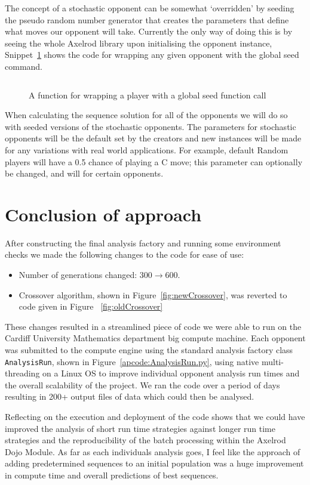 The concept of a stochastic opponent can be somewhat `overridden' by seeding the pseudo random number generator that creates the parameters that define what moves our opponent will take.
Currently the only way of doing this is by seeing the whole Axelrod library upon initialising the opponent instance, Snippet~\ref{code:wrappingFunction} shows the code for wrapping any given opponent with the global seed command.

\begin{figure}
    \inputminted{python}{code_snippets/classWrappingFunction.py}
    \caption{A function for wrapping a player with a global seed function call}\label{code:wrappingFunction}
\end{figure}

When calculating the sequence solution for all of the opponents we will do so with seeded versions of the stochastic opponents.
The parameters for stochastic opponents will be the default set by the creators and new instances will be made for any variations with real world applications.
For example, default Random players will have a 0.5 chance of playing a C move;
this parameter can optionally be changed, and will for certain opponents.

\section{Conclusion of approach}\label{sec:conclusionOfApproach}
After constructing the final analysis factory and running some environment checks we made the following changes to the code for ease of use:
\begin{itemize}
    \item Number of generations changed: $300\rightarrow600$.
    \item Crossover algorithm, shown in Figure~\ref{fig:newCrossover}, was reverted to code given in Figure ~\ref{fig:oldCrossover}
\end{itemize}

These changes resulted in a streamlined piece of code we were able to run on the Cardiff University Mathematics department big compute machine.
Each opponent was submitted to the compute engine using the standard analysis factory class \texttt{AnalysisRun}, shown in Figure~\ref{apcode:AnalysisRun.py}, using native multi-threading on a Linux OS to improve individual opponent analysis run times and the overall scalability of the project.
We ran the code over a period of days resulting in 200+ output files of data which could then be analysed.

Reflecting on the execution and deployment of the code shows that we could have improved the analysis of short run time strategies against longer run time strategies and the reproducibility of the batch processing within the Axelrod Dojo Module.
As far as each individuals analysis goes, I feel like the approach of adding predetermined sequences to an initial population was a huge improvement in compute time and overall predictions of best sequences. 


